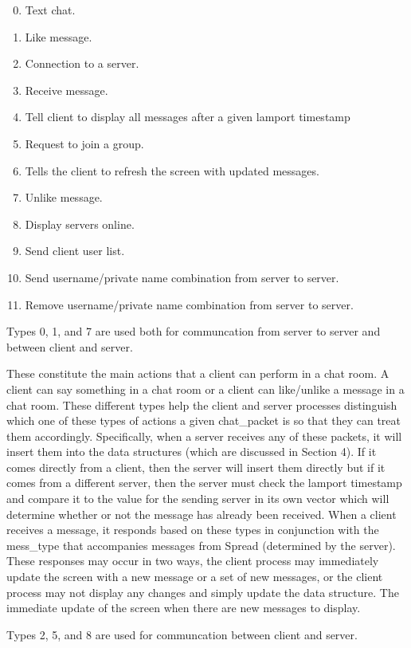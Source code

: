 \documentclass[12pt,journal,compsoc]{IEEEtran}
\begin{document}
\begin{enumerate}
\setcounter{enumi}{-1}
\item Text chat.
\item Like message.
\item Connection to a server.
\item Receive message.
\item Tell client to display all messages after a given lamport timestamp
\item Request to join a group.
\item Tells the client to refresh the screen with updated messages.
\item Unlike message.
\item Display servers online.
\item Send client user list.
\item Send username/private name combination from server to server.
\item Remove username/private name combination from server to server.
\end{enumerate}

Types 0, 1, and 7 are used both for communcation from server to server and between client and server.

These constitute the main actions that a client can perform in a chat room. A client can say something in a chat room or a client can like/unlike a message in a chat room. These different types help the client and server processes distinguish which one of these types of actions a given chat\_packet is so that they can treat them accordingly. Specifically, when a server receives any of these packets, it will insert them into the data structures (which are discussed in Section 4). If it comes directly from a client, then the server will insert them directly but if it comes from a different server, then the server must check the lamport timestamp and compare it to the value for the sending server in its own vector which will determine whether or not the message has already been received. When a client receives a message, it responds based on these types in conjunction with the mess\_type that accompanies messages from Spread (determined by the server). These responses may occur in two ways, the client process may immediately update the screen with a new message or a set of new messages, or the client process may not display any changes and simply update the data structure. The immediate update of the screen when there are new messages to display.

Types 2, 5, and 8 are used for communcation between client and server.
\end{document}
